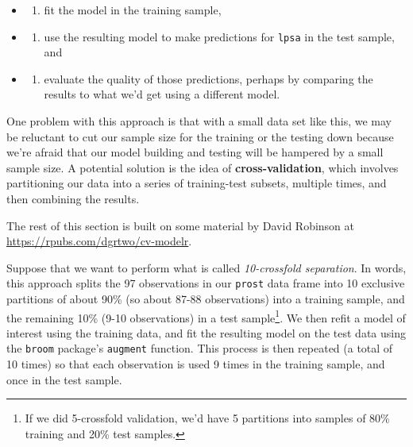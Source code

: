 \documentclass[]{book}
\providecommand{\tightlist}{%
  \setlength{\itemsep}{0pt}\setlength{\parskip}{0pt}}
\let\rmarkdownfootnote\footnote%
\def\footnote{\protect\rmarkdownfootnote}
\theoremstyle{definition}
\theoremstyle{definition}
\theoremstyle{definition}
\theoremstyle{remark}
\begin{document}
\begin{itemize}
\item
  \begin{enumerate}
  \def\labelenumi{\arabic{enumi}.}
  \tightlist
  \item
    fit the model in the training sample,
  \end{enumerate}
\item
  \begin{enumerate}
  \def\labelenumi{\arabic{enumi}.}
  \setcounter{enumi}{1}
  \tightlist
  \item
    use the resulting model to make predictions for \texttt{lpsa} in the
    test sample, and
  \end{enumerate}
\item
  \begin{enumerate}
  \def\labelenumi{\arabic{enumi}.}
  \setcounter{enumi}{2}
  \tightlist
  \item
    evaluate the quality of those predictions, perhaps by comparing the
    results to what we'd get using a different model.
  \end{enumerate}
\end{itemize}

One problem with this approach is that with a small data set like this,
we may be reluctant to cut our sample size for the training or the
testing down because we're afraid that our model building and testing
will be hampered by a small sample size. A potential solution is the
idea of \textbf{cross-validation}, which involves partitioning our data
into a series of training-test subsets, multiple times, and then
combining the results.

The rest of this section is built on some material by David Robinson at
\url{https://rpubs.com/dgrtwo/cv-modelr}.

Suppose that we want to perform what is called \emph{10-crossfold
separation}. In words, this approach splits the 97 observations in our
\texttt{prost} data frame into 10 exclusive partitions of about 90\% (so
about 87-88 observations) into a training sample, and the remaining 10\%
(9-10 observations) in a test sample\footnote{If we did 5-crossfold
  validation, we'd have 5 partitions into samples of 80\% training and
  20\% test samples.}. We then refit a model of interest using the
training data, and fit the resulting model on the test data using the
\texttt{broom} package's \texttt{augment} function. This process is then
repeated (a total of 10 times) so that each observation is used 9 times
in the training sample, and once in the test sample.
\end{document}
